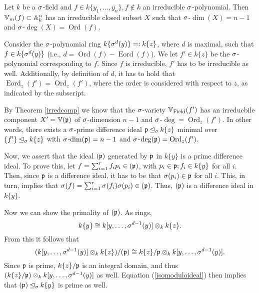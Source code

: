 \begin{cor}\label{corfinal}
Let $k$ be a $\sigma$-field and $f \in k\{y_1,\ldots,y_n\}, f \notin k$ an irreducible $\sigma$-polynomial. 
Then $\mathbb{V}_m(f) \subset \mathbb{A}_k^n$ has an irreducible closed subset $X$ such that $\sigma$-$\dim(X) = n-1$ and $\sigma$-$\operatorname{deg}(X) = \operatorname{Ord}(f)$.
\begin{bew}
Consider the $\sigma$-polynomial ring $k\{\sigma^d(y)\} =: k\{z\}$, where $d$ is maximal, such that $f \in k\{\sigma^d(y)\}$ (i.e., $d = \operatorname{Ord}(f) - \operatorname{Eord}(f)$). We let $f'\in k\{z\}$ be the $\sigma$-polynomial corresponding to $f$. 
Since $f$ is irreducible, $f'$ has to be irreducible as well. Additionally, by definition of $d$, it has to hold that $\operatorname{Eord}_z(f') = \operatorname{Ord}_z(f')$, where the order is considered with respect to $z$,
as indicated by the subscript. 

By Theorem \ref{irredcomp} we know that the $\sigma$-variety $ \mathbb{V}_{\operatorname{Field}}(f')$ has an irreducbile component $X' = \mathbb{V}(\mathfrak{p})$ of $\sigma$-dimension $n-1$ and $\sigma$-$\operatorname{deg} = \operatorname{Ord}_z(f')$. In other words, there exists a $\sigma$-prime difference ideal $\mathfrak{p} \unlhd_{\sigma} k\{z\}$ minimal over $\{f'\} \unlhd_{\sigma} k\{z\}$ with
$\sigma$-$\dim(\mathfrak{p}) = n-1$ and $\sigma$-$\operatorname{deg}(\mathfrak{p}) = \operatorname{Ord}_z(f')$. 

Now, we assert that the ideal $(\mathfrak{p})$ generated by $\mathfrak{p}$ in $k\{y\}$ is a prime difference ideal. 
To prove this, let $f = \sum_{i=1}^r f_i p_i \in (\mathfrak{p})$, with $p_i \in \mathfrak{p}; f_i \in k\{y\}$ for all $i$. Then, since $\mathfrak{p}$ is a difference ideal, it has to be that $\sigma(p_i) \in \mathfrak{p}$ for all $i$.
This, in turn, implies that $\sigma(f) =  \sum_{i=1}^r \sigma(f_i) \sigma(p_i) \in (\mathfrak{p})$. Thus, $(\mathfrak{p})$ is a difference ideal in $k\{y\}$. 

Now we can show the primality of $(\mathfrak{p})$. As rings, $$k\{y\} \cong k[y,\ldots,\sigma^{d-1}(y)] \otimes_k k\{z\}.$$
From this it follows that 
\begin{equation}\label{isomoduloideal} (k[y,\ldots,\sigma^{d-1}(y)] \otimes_k k\{z\}) / (\mathfrak{p}) \cong k\{z\} / \mathfrak{p} \otimes_k k[y,\ldots,\sigma^{d-1}(y)]. \end{equation}
Since $\mathfrak{p}$ is prime, $k\{z\}/\mathfrak{p}$ is an integral domain, and thus $(k\{z\}/\mathfrak{p}) \otimes_k k[y,\ldots,\sigma^{d-1}(y)]$ as well.
Equation (\ref{isomoduloideal}) then implies that $(\mathfrak{p}) \unlhd_{\sigma} k\{y\}$ is prime as well. 


\end{bew}
\end{cor}
